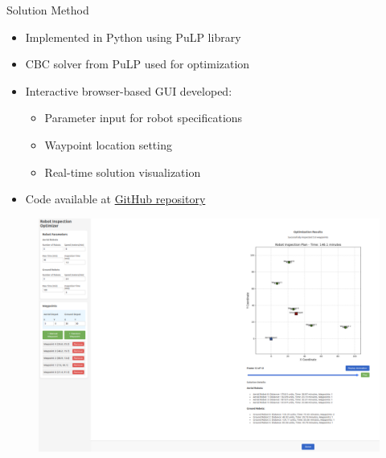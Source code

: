 \documentclass[11pt,xcolor={dvipsnames},hyperref={pdftex,pdfpagemode=UseNone,hidelinks,pdfdisplaydoctitle=true},usepdftitle=false]{beamer}
\begin{document}
  \begin{frame}{Solution Method}
    \begin{itemize}
      \item Implemented in Python using PuLP library
      \item CBC solver from PuLP used for optimization
      \item Interactive browser-based GUI developed:
        \begin{itemize}
          \item Parameter input for robot specifications
          \item Waypoint location setting
          \item Real-time solution visualization
        \end{itemize}
      \item Code available at \href{https://github.com/jc-cr/multirobot_inspection_optimizer}{GitHub repository}
    \end{itemize}
    
        \begin{figure}
          \centering
          \includegraphics[width=0.5\linewidth]{figures/insp.pdf}
        \end{figure}
      \end{frame}
\end{document}
